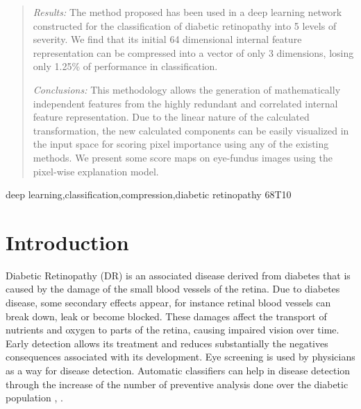 \documentclass[review]{elsarticle}
\theoremstyle{definition} %
\theoremstyle{remark}
\begin{document}
\begin{frontmatter}
\begin{abstract}
\emph{Results:} The method proposed has been used in a deep learning network constructed for the classification of diabetic retinopathy into 5 levels of severity. We find that its initial 64 dimensional internal feature representation can be compressed into a vector of only 3 dimensions, losing only 1.25\% of performance in classification. 

\emph{Conclusions:} This methodology allows the generation of mathematically independent features from the highly redundant and correlated internal feature representation. Due to the linear nature of the calculated transformation, the new calculated components can be easily visualized in the input space for scoring pixel importance using any of the existing methods. We present some score maps on eye-fundus images using the pixel-wise explanation model.

\end{abstract}

\begin{keyword}
deep learning\sep classification\sep compression\sep diabetic retinopathy
\MSC[2010] 68T10
\end{keyword}

\end{frontmatter}


\section{Introduction}

Diabetic Retinopathy (DR) is an associated disease derived from diabetes that is caused by the damage of the small blood vessels of the retina. Due to diabetes disease, some secondary effects appear, for instance retinal blood vessels can break down, leak or become blocked. These damages affect the transport of nutrients and oxygen to parts of the retina, causing impaired vision over time. Early detection allows its treatment and reduces substantially the negatives consequences associated with its development. Eye screening is used by physicians as a way for disease detection. Automatic classifiers can help in disease detection through the increase of the number of preventive analysis done over the diabetic population \cite{pedro2010prevalence}, \cite{romero2011managing}.
\end{document}
